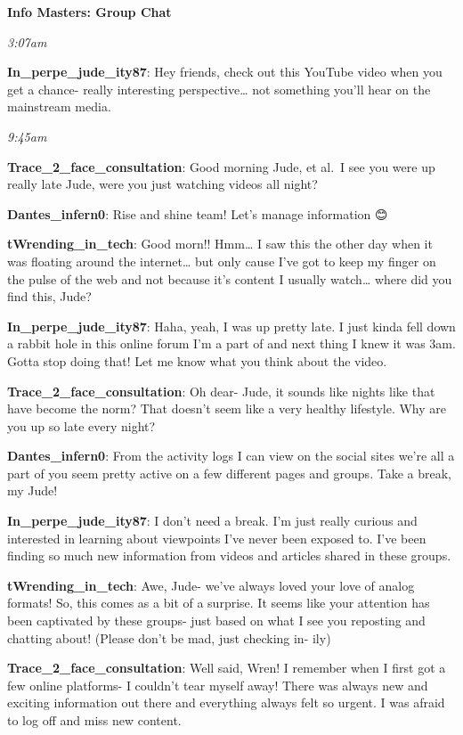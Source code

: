 \documentclass[
  letterpaper,
  DIV=11,
  numbers=noendperiod]{scrreprt}
\begin{document}
\textbf{Info Masters: Group Chat}

\emph{3:07am}

\textbf{In\_perpe\_jude\_ity87}: Hey friends, check out this YouTube
video when you get a chance- really interesting perspective\ldots{} not
something you'll hear on the mainstream media.

\emph{9:45am}

\textbf{Trace\_2\_face\_consultation}: Good morning Jude, et al.~I see
you were up really late Jude, were you just watching videos all night?

\textbf{Dantes\_infern0}: Rise and shine team! Let's manage information
😊

\textbf{tWrending\_in\_tech}: Good morn!! Hmm\ldots{} I saw this the
other day when it was floating around the internet\ldots{} but only
cause I've got to keep my finger on the pulse of the web and not because
it's content I usually watch\ldots{} where did you find this, Jude?

\textbf{In\_perpe\_jude\_ity87}: Haha, yeah, I was up pretty late. I
just kinda fell down a rabbit hole in this online forum I'm a part of
and next thing I knew it was 3am. Gotta stop doing that! Let me know
what you think about the video.

\textbf{Trace\_2\_face\_consultation}: Oh dear- Jude, it sounds like
nights like that have become the norm? That doesn't seem like a very
healthy lifestyle. Why are you up so late every night?

\textbf{Dantes\_infern0}: From the activity logs I can view on the
social sites we're all a part of you seem pretty active on a few
different pages and groups. Take a break, my Jude!

\textbf{In\_perpe\_jude\_ity87}: I don't need a break. I'm just really
curious and interested in learning about viewpoints I've never been
exposed to. I've been finding so much new information from videos and
articles shared in these groups.

\textbf{tWrending\_in\_tech}: Awe, Jude- we've always loved your love of
analog formats! So, this comes as a bit of a surprise. It seems like
your attention has been captivated by these groups- just based on what I
see you reposting and chatting about! (Please don't be mad, just
checking in- ily)

\textbf{Trace\_2\_face\_consultation}: Well said, Wren! I remember when
I first got a few online platforms- I couldn't tear myself away! There
was always new and exciting information out there and everything always
felt so urgent. I was afraid to log off and miss new content.
\end{document}
